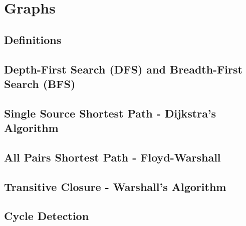 \section{Graphs}

\subsection{Definitions}




\subsection{Depth-First Search (DFS) and Breadth-First Search (BFS)} \label{graph_traversals}



\clearpage

\subsection{Single Source Shortest Path - Dijkstra's Algorithm}



\subsection{All Pairs Shortest Path - Floyd-Warshall}



\subsection{Transitive Closure - Warshall's Algorithm}



\clearpage


\subsection{Cycle Detection}
